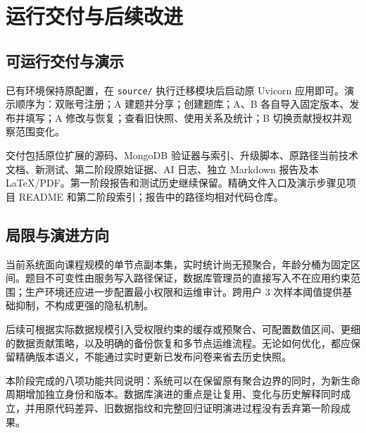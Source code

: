 \documentclass[UTF8,10pt,a4paper,twocolumn,fontset=none]{ctexart}
\begin{document}
\section{运行交付与后续改进}
\subsection{可运行交付与演示}
已有环境保持原配置，在 \texttt{source/} 执行迁移模块后启动原 Uvicorn 应用即可。演示顺序为：双账号注册；A 建题并分享；创建题库；A、B 各自导入固定版本、发布并填写；A 修改与恢复；查看旧快照、使用关系及统计；B 切换贡献授权并观察范围变化。

交付包括原位扩展的源码、MongoDB 验证器与索引、升级脚本、原路径当前技术文档、新测试、第二阶段原始证据、AI 日志、独立 Markdown 报告及本 LaTeX/PDF。第一阶段报告和测试历史继续保留。精确文件入口及演示步骤见项目 README 和第二阶段索引；报告中的路径均相对代码仓库。

\subsection{局限与演进方向}
当前系统面向课程规模的单节点副本集，实时统计尚无预聚合，年龄分桶为固定区间。题目不可变性由服务写入路径保证，数据库管理员的直接写入不在应用约束范围；生产环境还应进一步配置最小权限和运维审计。跨用户 3 次样本阈值提供基础抑制，不构成更强的隐私机制。

后续可根据实际数据规模引入受权限约束的缓存或预聚合、可配置数值区间、更细的数据贡献策略，以及明确的备份恢复和多节点运维流程。无论如何优化，都应保留精确版本语义，不能通过实时更新已发布问卷来省去历史快照。

本阶段完成的八项功能共同说明：系统可以在保留原有聚合边界的同时，为新生命周期增加独立身份和版本。数据库演进的重点是让复用、变化与历史解释同时成立，并用原代码差异、旧数据指纹和完整回归证明演进过程没有丢弃第一阶段成果。
\end{document}
